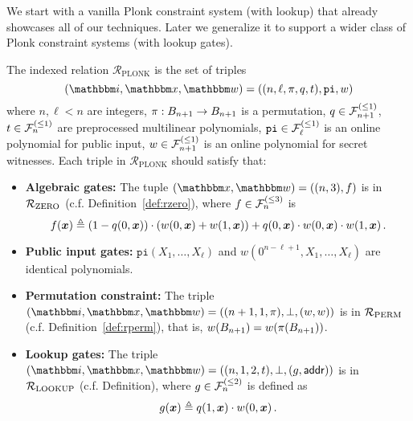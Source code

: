 \newcommand{\sel}{q} %
\newcommand{\tabp}{t} %
\newcommand{\pubinp}{\mathtt{pi}} %
\newcommand{\RPLONK}{{\mathcal{R}}_{\text{PLONK}}}
\newcommand{\RGPLONK}{{\mathcal{R}}_{\text{GPLONK}}} %
\newcommand{\witp}{w} %
\newcommand{\lsel}{\ell_q} %
\newcommand{\ltab}{\ell_t} %
\newcommand{\lwit}{\ell_w} %
\newcommand{\gatep}{\mathtt{gate}} %
\newcommand{\lgatep}{\mathtt{lkgate}} %
\newcommand{\ltabp}{\mathtt{tab}} %
\newcommand{\dgate}{d_{gt}} %
\newcommand{\dlk}{d_{lk}} %
\newcommand{\dtab}{d_t} %


We start with a vanilla Plonk constraint system (with lookup) 
that already showcases all of our techniques. Later we generalize 
it to support a wider class of Plonk constraint systems (with lookup gates).

\begin{definition}
    The indexed relation $\RPLONK$ is the set of triples 
    \[
        (\idxR, \instR, \witR) = ((n, \ell, \perm, \sel, \tabp), \pubinp, \witp)
    \]
    where $n, \ell < n$ are integers, $\pi : B_{n+1} \rightarrow B_{n+1}$
    is a permutation, $\sel \in \bdp{n+1}{1}$, $\tabp \in \bdp{n}{1}$ are preprocessed 
    multilinear polynomials, $\pubinp \in \bdp{\ell}{1}$ is an 
    online polynomial for public input, $\witp \in \bdp{n+1}{1}$
    is an online polynomial for secret witnesses. Each triple in $\RPLONK$ should satisfy that:
    \begin{itemize}
        \item \textbf{Algebraic gates:} The tuple $(\instR, \witR) = ((n,3), f)$ is in ${\mathcal{R}}_{\text{ZERO}}$ (c.f. Definition~\ref{def:rzero}),
            where $f \in {\mathcal{F}}_{n}^{(\le{3})}$ is
            \[
              f(\xv) \deq (1-\sel(0, \xv))\cdot (\witp(0, \xv) + \witp(1, \xv)) + \sel(0, \xv) \cdot \witp(0, \xv) \cdot \witp(1, \xv)\,.
            \] 
        \item \textbf{Public input gates:} $\pubinp(X_1, \dots, X_{\ell})$ and $\witp(0^{n-\ell+1}, X_1, \dots, X_{\ell})$
            are identical polynomials.
        \item \textbf{Permutation constraint:} The triple $(\idxR, \instR, \witR)=((n+1, 1, \perm), \bot, (\witp, \witp))$ 
            is in ${\mathcal{R}}_{\text{PERM}}$ (c.f. Definition~\ref{def:rperm}), that is, $\witp(\bcube{n+1}) = \witp(\perm(\bcube{n+1}))$.
        \item \textbf{Lookup gates:} The triple $(\idxR, \instR, \witR)=((n, 1, 2, \tabp), \bot, (g, \addr))$
            is in ${\mathcal{R}}_{\text{LOOKUP}}$ (c.f. Definition), where $g \in {\mathcal{F}}_{n}^{(\le{2})}$ is defined as 
            \[
              g(\xv) \deq \sel(1, \xv) \cdot \witp(0, \xv) \,.
            \]
    \end{itemize}
\end{definition}

